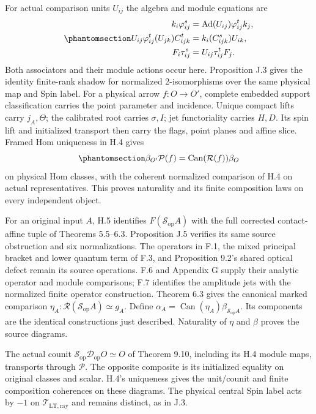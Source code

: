 \documentclass[
  english,
  11pt,
  reqno]{amsart}
\begin{document}
For actual comparison units \(U_{ij}\) the algebra and module equations
are
\begin{equation}\protect\phantomsection\label{eq:gg-simultaneous-actual-comparison-equations}{
 \begin{aligned}
 k_i\varphi^s_{ij}
   &=\operatorname{Ad}(U_{ij})\varphi^t_{ij}k_j,\\
 U_{ij}\varphi^t_{ij}(U_{jk})C^t_{ijk}
   &=k_i(C^s_{ijk})U_{ik},\\
 F_i\tau^s_{ij}&=U_{ij}\tau^t_{ij}F_j.
 \end{aligned}
}\end{equation} Both associators and their module actions occur here.
Proposition J.3 gives the identity finite-rank shadow for normalized
2-isomorphisms over the same physical map and Spin label. For a physical
arrow \(f:O\to O'\), complete embedded support classification carries
the point parameter and incidence. Unique compact lifts carry
\(j_A,\Theta\); the calibrated root carries \(\sigma,I\); jet
functoriality carries \(H,D\). Its spin lift and initialized transport
then carry the flags, point planes and affine slice. Framed Hom
uniqueness in H.4 gives
\begin{equation}\protect\phantomsection\label{eq:gg-simultaneous-naturality}{
 \beta_{O'}\mathcal P(f)
   =\operatorname{Can}(\mathcal R(f))\beta_O
}\end{equation} on physical Hom classes, with the coherent normalized
comparison of H.4 on actual representatives. This proves naturality and
its finite composition laws on every independent object.

For an original input \(A\), H.5 identifies
\(F(\mathcal S_{\mathrm{op}}A)\) with the full corrected contact-affine
tuple of Theorems 5.5--6.3. Proposition J.5 verifies its same source
obstruction and six normalizations. The operators in F.1, the mixed
principal bracket and lower quantum term of F.3, and Proposition 9.2's
shared optical defect remain its source operations. F.6 and Appendix G
supply their analytic operator and module comparisons; F.7 identifies
the amplitude jets with the normalized finite operator construction.
Theorem 6.3 gives the canonical marked comparison
\(\eta_A:\mathcal R(\mathcal S_{\mathrm{op}}A)\simeq g_A\). Define
\(\alpha_A=\operatorname{Can}(\eta_A)\beta_{\mathcal S_{\mathrm{op}}A}\).
Its components are the identical constructions just described.
Naturality of \(\eta\) and \(\beta\) proves the source diagrams.

The actual counit
\(\mathcal S_{\mathrm{op}}\mathcal D_{\mathrm{op}}O\simeq O\) of Theorem
9.10, including its H.4 module maps, transports through \(\mathcal P\).
The opposite composite is its initialized equality on original classes
and scalar. H.4's uniqueness gives the unit/counit and finite
composition coherences on these diagrams. The physical central Spin
label acts by \(-1\) on \(\mathcal T_{\mathrm{LT,ray}}\) and remains
distinct, as in J.3.
\end{document}
